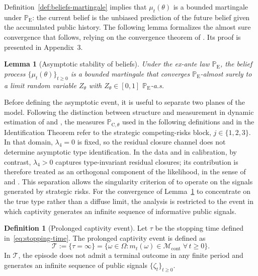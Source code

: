 \documentclass[ecta,nameyear,draft]{econsocart}
\theoremstyle{plain}
\newtheorem{lemma}[theorem]{Lemma}
\theoremstyle{definition}
\newtheorem{definition}[theorem]{Definition}
\newcommand{\ProbE}{\mathbb{P}_{\mathrm{E}}}
\newcommand{\ProbC}[1]{\mathbb{P}_{\mathrm{C},#1}}
\newcommand{\1}{\mathbf{1}}
\begin{document}
Definition~\ref{def:beliefs-martingale} implies that $\mu_t(\theta)$ is a bounded martingale under $\ProbE$: the current belief is the unbiased prediction of the future belief given the accumulated public history. The following lemma formalizes the almost sure convergence that follows, relying on the convergence theorem of \citet{Doob1953Stochastic}. Its proof is presented in Appendix~3.

\begin{lemma}[Asymptotic stability of beliefs]\label{lem:asymptotic-beliefs}
Under the ex-ante law $\ProbE$, the belief process $\{\mu_t(\theta)\}_{t\ge 0}$ is a bounded martingale that converges $\ProbE$-almost surely to a limit random variable $Z_\theta$ with $Z_\theta\in[0,1]$ $\ProbE$-a.s.
\end{lemma}

\smallskip

Before defining the asymptotic event, it is useful to separate two planes of the model. Following the distinction between structure and measurement in dynamic estimation of \citet{Rust1987} and \citet{MagnacThesmar2002}, the measures $\ProbC{\theta}$ used in the following definitions and in the Identification Theorem refer to the strategic competing-risks block, $j\in\{1,2,3\}$. In that domain, $\lambda_4=0$ is fixed, so the residual closure channel does not determine asymptotic type identification. In the data and in calibration, by contrast, $\lambda_4>0$ captures type-invariant residual closures; its contribution is therefore treated as an orthogonal component of the likelihood, in the sense of \citet{Lancaster1990} and \citet{AbbringVanDenBerg2003}. This separation allows the singularity criterion of \citet{Kakutani1948} to operate on the signals generated by strategic risks. For the convergence of Lemma~\ref{lem:asymptotic-beliefs} to concentrate on the true type rather than a diffuse limit, the analysis is restricted to the event in which captivity generates an infinite sequence of informative public signals.

\begin{definition}[Prolonged captivity event]\label{def:event-T-long}
Let $\tau$ be the stopping time defined in~\eqref{eq:stopping-time}. The prolonged captivity event is defined as
\[
\mathcal{T}:=\{\tau=\infty\}=\bigl\{\omega\in\Omega:m_t(\omega)\in\mathcal{M}_{\mathrm{cont}}\;\forall\,t\ge 0\bigr\}.
\]
In $\mathcal{T}$, the episode does not admit a terminal outcome in any finite period and generates an infinite sequence of public signals $\{\zeta_t\}_{t\ge 0}$.
\end{definition}
\end{document}
